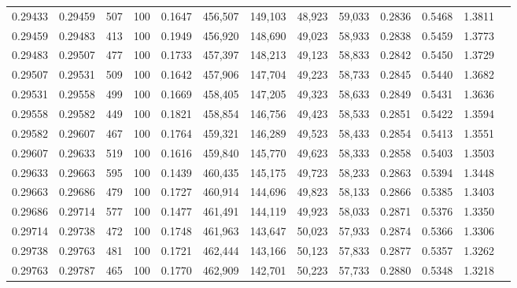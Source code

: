 \begin{tabular}{rrrrrrrrrrrrr}
0.29433 & 0.29459 &   507 & 100 &                                     0.1647 & 456,507 & 149,103 &  48,923 &  59,033 & 0.2836 & 0.5468 & 1.3811 \\
0.29459 & 0.29483 &   413 & 100 &                                     0.1949 & 456,920 & 148,690 &  49,023 &  58,933 & 0.2838 & 0.5459 & 1.3773 \\
0.29483 & 0.29507 &   477 & 100 &                                     0.1733 & 457,397 & 148,213 &  49,123 &  58,833 & 0.2842 & 0.5450 & 1.3729 \\
0.29507 & 0.29531 &   509 & 100 &                                     0.1642 & 457,906 & 147,704 &  49,223 &  58,733 & 0.2845 & 0.5440 & 1.3682 \\
0.29531 & 0.29558 &   499 & 100 &                                     0.1669 & 458,405 & 147,205 &  49,323 &  58,633 & 0.2849 & 0.5431 & 1.3636 \\
0.29558 & 0.29582 &   449 & 100 &                                     0.1821 & 458,854 & 146,756 &  49,423 &  58,533 & 0.2851 & 0.5422 & 1.3594 \\
0.29582 & 0.29607 &   467 & 100 &                                     0.1764 & 459,321 & 146,289 &  49,523 &  58,433 & 0.2854 & 0.5413 & 1.3551 \\
0.29607 & 0.29633 &   519 & 100 &                                     0.1616 & 459,840 & 145,770 &  49,623 &  58,333 & 0.2858 & 0.5403 & 1.3503 \\
0.29633 & 0.29663 &   595 & 100 &                                     0.1439 & 460,435 & 145,175 &  49,723 &  58,233 & 0.2863 & 0.5394 & 1.3448 \\
0.29663 & 0.29686 &   479 & 100 &                                     0.1727 & 460,914 & 144,696 &  49,823 &  58,133 & 0.2866 & 0.5385 & 1.3403 \\
0.29686 & 0.29714 &   577 & 100 &                                     0.1477 & 461,491 & 144,119 &  49,923 &  58,033 & 0.2871 & 0.5376 & 1.3350 \\
0.29714 & 0.29738 &   472 & 100 &                                     0.1748 & 461,963 & 143,647 &  50,023 &  57,933 & 0.2874 & 0.5366 & 1.3306 \\
0.29738 & 0.29763 &   481 & 100 &                                     0.1721 & 462,444 & 143,166 &  50,123 &  57,833 & 0.2877 & 0.5357 & 1.3262 \\
0.29763 & 0.29787 &   465 & 100 &                                     0.1770 & 462,909 & 142,701 &  50,223 &  57,733 & 0.2880 & 0.5348 & 1.3218 \\

\end{tabular}
